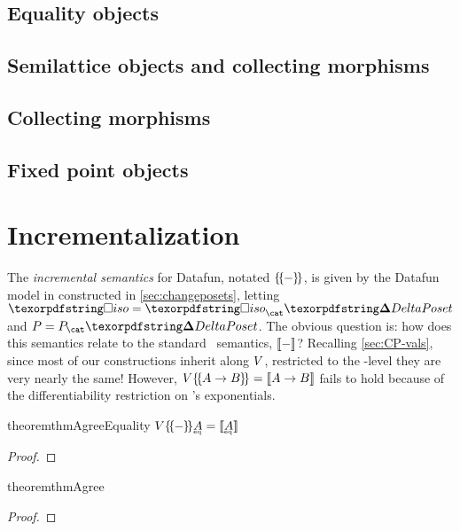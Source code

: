 
\subsection{Equality objects}
\label{sec:CP-eq}

\subsection{Semilattice objects and collecting morphisms}
\label{sec:CP-semilattice}

\subsection{Collecting morphisms}
\label{sec:CP-collect}

\subsection{Fixed point objects}
\label{sec:CP-fix}


\section{Incrementalization}
\label{sec:incremental}

The \emph{incremental semantics} for Datafun, notated $\{\kern-.18em\{\kern-.05em{-}\kern-.05em\}\kern -.18em\}$, is given by
the Datafun model in \CP{} constructed in \cref{sec:changeposets}, letting
$\disco = \iso_\CP$ and $\pfin = \pfin_\CP$. The obvious question is: how does
this semantics relate to the standard \Poset\ semantics, $\llbracket{-}\rrbracket$? Recalling
\cref{sec:CP-vals}, since most of our constructions inherit along $V$,
restricted to the \Poset-level they are very nearly the same!
%
However, $V{\{\kern-.18em\{\kern-.05em{A \to B}\kern-.05em\}\kern -.18em\}} = \llbracket{A \to B}\rrbracket$ fails to hold because of the
differentiability restriction on \CP's exponentials.


\begin{restatable}{theorem}{thmAgreeEquality}
  \( \vals{\incdens{\eqt A}} = \den{\eqt A} \)
\end{restatable}
\begin{proof}
\end{proof}

\begin{restatable}{theorem}{thmAgree}
  \XXX
\end{restatable}
\begin{proof}
\end{proof}

